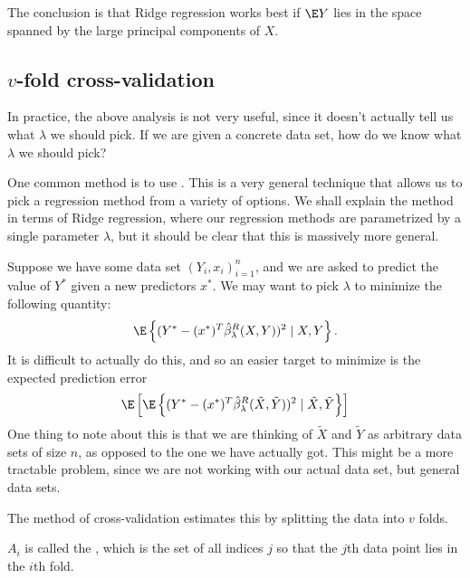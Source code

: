 \documentclass[a4paper]{article}
\begin{document}
The conclusion is that Ridge regression works best if $\E Y$ lies in the space spanned by the large principal components of $X$. %

\subsection{\texorpdfstring{$v$}{v}-fold cross-validation}
In practice, the above analysis is not very useful, since it doesn't actually tell us what $\lambda$ we should pick. If we are given a concrete data set, how do we know what $\lambda$ we should pick?

One common method is to use . This is a very general technique that allows us to pick a regression method from a variety of options. We shall explain the method in terms of Ridge regression, where our regression methods are parametrized by a single parameter $\lambda$, but it should be clear that this is massively more general.

Suppose we have some data set $(Y_i, x_i)_{i = 1}^n$, and we are asked to predict the value of $Y^*$ given a new predictors $x^*$. We may want to pick $\lambda$ to minimize the following quantity:
\[
  \E \left\{ (Y^* - (x^*)^T \hat{\beta}_\lambda^R(X, Y))^2 \mid X, Y \right\}.
\]
It is difficult to actually do this, and so an easier target to minimize is the expected prediction error
\[
  \E\left[\E \left\{ (Y^* - (x^*)^T \hat{\beta}_\lambda^R(\tilde{X}, \tilde{Y}))^2 \mid \tilde{X}, \tilde{Y} \right\}\right]
\]
One thing to note about this is that we are thinking of $\tilde{X}$ and $\tilde{Y}$ as arbitrary data sets of size $n$, as opposed to the one we have actually got. This might be a more tractable problem, since we are not working with our actual data set, but general data sets.

The method of cross-validation estimates this by splitting the data into $v$ folds.
\begin{center}
\end{center}
$A_i$ is called the , which is the set of all indices $j$ so that the $j$th data point lies in the $i$th fold.
\end{document}
